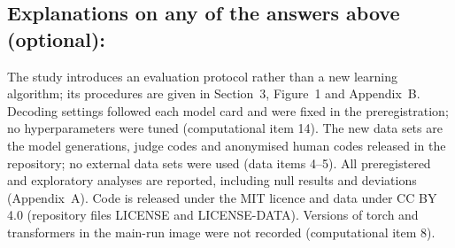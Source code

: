 \subsection*{Explanations on any of the answers above (optional):}

The study introduces an evaluation protocol rather than a new learning algorithm; its procedures are given in Section~3, Figure~1 and Appendix~B. Decoding settings followed each model card and were fixed in the preregistration; no hyperparameters were tuned (computational item 14). The new data sets are the model generations, judge codes and anonymised human codes released in the repository; no external data sets were used (data items 4--5). All preregistered and exploratory analyses are reported, including null results and deviations (Appendix~A). Code is released under the MIT licence and data under CC BY 4.0 (repository files LICENSE and LICENSE-DATA). Versions of torch and transformers in the main-run image were not recorded (computational item 8).
